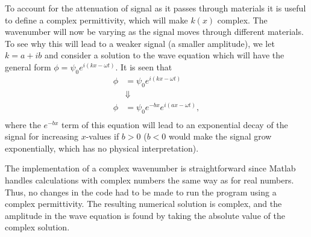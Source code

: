 \documentclass[10pt,a4paper]{article}
\begin{document}
To account for the attenuation of signal as it passes through materials it is useful to define a complex permittivity, which will make $k(x)$ complex. The wavenumber will now be varying as the signal moves through different materials. To see why this will lead to a weaker signal (a smaller amplitude), we  let $k = a + ib$ and consider a solution to the wave equation which will have the general form $\phi = \psi_0 e^{i(kx- \omega t)}$. It is seen that 
\begin{align*}
\phi &= \psi_0 e^{i(kx- \omega t)} \\
 &\Downarrow \\
 \phi &= \psi_0 e^{-bx} e^{i(ax- \omega t)}, \\
\end{align*}
where the $e^{-bx}$ term of this equation will lead to an exponential decay of the signal for increasing $x$-values if $b>0$ ($b<0$ would make the signal grow exponentially, which has no physical interpretation).

The implementation of a complex wavenumber is straightforward since Matlab handles calculations with complex numbers the same way as for real numbers. Thus, no changes in the code had to be made to run the program using a complex permittivity. The resulting numerical solution is complex, and the amplitude in the wave equation is found by taking the absolute value of the complex solution.
\end{document}
